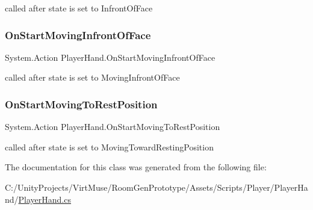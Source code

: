 called after state is set to Infront\+Of\+Face 

\mbox{\label{class_player_hand_a144ea34305e5efa1ffae73c9d1f5fd9d}} 
\subsubsection{\texorpdfstring{On\+Start\+Moving\+Infront\+Of\+Face}{OnStartMovingInfrontOfFace}}
{\footnotesize\ttfamily System.\+Action Player\+Hand.\+On\+Start\+Moving\+Infront\+Of\+Face}



called after state is set to Moving\+Infront\+Of\+Face 

\mbox{\label{class_player_hand_a4e94ca5bad6ece9013cd872dcf373074}} 
\subsubsection{\texorpdfstring{On\+Start\+Moving\+To\+Rest\+Position}{OnStartMovingToRestPosition}}
{\footnotesize\ttfamily System.\+Action Player\+Hand.\+On\+Start\+Moving\+To\+Rest\+Position}



called after state is set to Moving\+Toward\+Resting\+Position 



The documentation for this class was generated from the following file\+:\begin{DoxyCompactItemize}
\item 
C\+:/\+Unity\+Projects/\+Virt\+Muse/\+Room\+Gen\+Prototype/\+Assets/\+Scripts/\+Player/\+Player\+Hand/\mbox{\hyperlink{_player_hand_8cs}{Player\+Hand.\+cs}}\end{DoxyCompactItemize}
